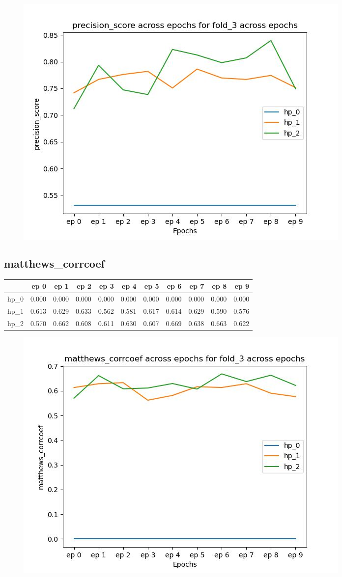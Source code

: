 \documentclass{article}
\begin{document}
\begin{figure}[H]
\includegraphics[scale = 0.75]{fold_3/precision_score}
\end{figure}
\subsection{matthews\_corrcoef}
\begin{tabular}{lrrrrrrrrrr}
\toprule
{} &   ep 0 &   ep 1 &   ep 2 &   ep 3 &   ep 4 &   ep 5 &   ep 6 &   ep 7 &   ep 8 &   ep 9 \\
\midrule
hp\_0 &  0.000 &  0.000 &  0.000 &  0.000 &  0.000 &  0.000 &  0.000 &  0.000 &  0.000 &  0.000 \\
hp\_1 &  0.613 &  0.629 &  0.633 &  0.562 &  0.581 &  0.617 &  0.614 &  0.629 &  0.590 &  0.576 \\
hp\_2 &  0.570 &  0.662 &  0.608 &  0.611 &  0.630 &  0.607 &  0.669 &  0.638 &  0.663 &  0.622 \\
\bottomrule
\end{tabular}

\begin{figure}[H]
\includegraphics[scale = 0.75]{fold_3/matthews_corrcoef}
\end{figure}
\end{document}
